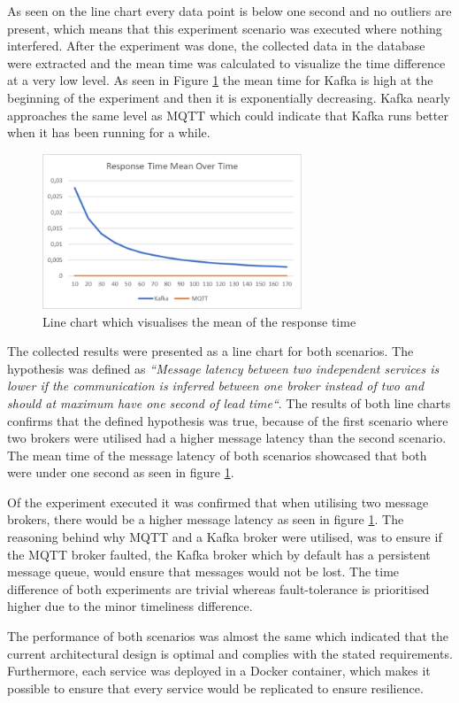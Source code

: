 As seen on the line chart every data point is below one second and no outliers are present, which means that this experiment scenario was executed where nothing interfered.
After the experiment was done, the collected data in the database were extracted and the mean time was calculated to visualize the time difference at a very low level. As seen in Figure \ref{fig:meanovertime} the mean time for Kafka is high at the beginning of the experiment and then it is exponentially decreasing. Kafka nearly approaches the same level as MQTT which could indicate that Kafka runs better when it has been running for a while.
\begin{figure}[h]
    \includegraphics[width=220pt]{images/meanovertime.png}
    \centering
    \caption{Line chart which visualises the mean of the response time }
    \label{fig:meanovertime}
\end{figure}
\newpage
The collected results were presented as a line chart for both scenarios. The hypothesis was defined as \textit{“Message latency between two independent services is lower if the communication is inferred between one broker instead of two and should at maximum have one second of lead time“}. The results of both line charts confirms that the defined hypothesis was true, because of the first scenario where two brokers were utilised had a higher message latency than the second scenario. The mean time of the message latency of both scenarios showcased that both were under one second as seen in figure \ref{fig:meanovertime}. 

Of the experiment executed it was confirmed that when utilising two message brokers, there would be a higher message latency as seen in figure \ref{fig:meanovertime}. The reasoning behind why MQTT and a Kafka broker were utilised, was to ensure if the MQTT broker faulted, the Kafka broker which by default has a persistent message queue, would ensure that messages would not be lost\cite{docsKafka}. The time difference of both experiments are trivial whereas fault-tolerance is prioritised higher due to the minor timeliness difference.

The performance of both scenarios was almost the same which indicated that the current architectural design is optimal and complies with the stated requirements. Furthermore, each service was deployed in a Docker container, which makes it possible to ensure that every service would be replicated to ensure resilience. 